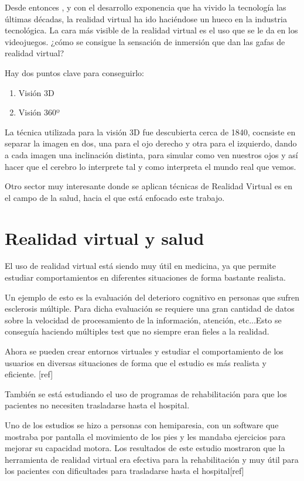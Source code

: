 \documentclass[twoside, 12pt]{epstfg}
\begin{document}
Desde entonces , y con el desarrollo exponencia que ha vivido la tecnología las últimas décadas, la realidad virtual ha ido haciéndose un hueco en la industria tecnológica.
La cara más visible de la realidad virtual es el uso que se le da en los videojuegos. ¿cómo se consigue la sensación de inmersión que dan las gafas de realidad virtual?

Hay dos puntos clave para conseguirlo:
\begin{enumerate}
	\item Visión 3D
	\item Visión 360º
\end{enumerate}

La técnica utilizada para la visión 3D fue descubierta cerca de 1840, cocnsiste en separar la imagen en dos, una para el ojo derecho y otra para el izquierdo, dando a cada imagen una inclinación distinta, para simular como ven nuestros ojos y así hacer que el cerebro lo interprete tal y como interpreta el mundo real que vemos.


Otro sector muy interesante donde se aplican técnicas de Realidad Virtual es en el campo de la salud, hacia el que está enfocado este trabajo.

\section{Realidad virtual y salud}
\label{sec:VR y salud}

El uso de realidad virtual está siendo muy útil en medicina, ya que permite estudiar comportamientos en diferentes situaciones de forma bastante realista.

Un ejemplo de esto es la evaluación del deterioro cognitivo en personas que sufren esclerosis múltiple. Para dicha evaluación se requiere una gran cantidad de datos sobre la velocidad de procesamiento de la información, atención, etc...Esto se conseguía haciendo múltiples test que no siempre eran fieles a la realidad.

Ahora se pueden crear entornos virtuales y estudiar el comportamiento de los usuarios en diversas situaciones de forma que el estudio es más realista y eficiente. [ref]


También se está estudiando el uso de programas de rehabilitación para que los pacientes no necesiten trasladarse hasta el hospital.

Uno de los estudios se hizo a personas con hemiparesia, con un software que mostraba por pantalla el movimiento de los pies y les mandaba ejercicios para mejorar su capacidad motora. Los resultados de este estudio mostraron que la herramienta de realidad virtual era efectiva para la rehabilitación y muy útil para los pacientes con dificultades para trasladarse hasta el hospital[ref]
\end{document}
